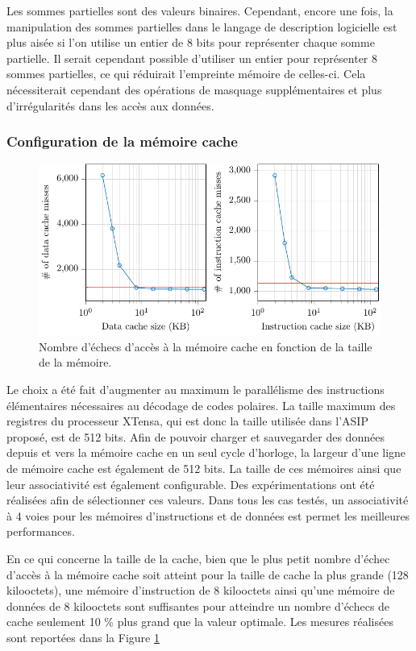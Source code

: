 Les sommes partielles sont des valeurs binaires. Cependant, encore une fois, la manipulation des sommes partielles dans le langage de description logicielle est plus aisée si l'on utilise un entier de 8 bits pour représenter chaque somme partielle. Il serait cependant possible d'utiliser un entier pour représenter 8 sommes partielles, ce qui réduirait l'empreinte mémoire de celles-ci. Cela nécessiterait cependant des opérations de masquage supplémentaires et plus d'irrégularités dans les accès aux données.

\subsubsection{Configuration de la mémoire cache}
\begin{figure}
\centering
\includegraphics[width=\textwidth]{main/ch3_fig/curves/memory/tikz/memory}
\caption{Nombre d'échecs d'accès à la mémoire cache en fonction de la taille de la mémoire.}
\label{fig:tensilica_mem}
\end{figure}

Le choix a été fait d'augmenter au maximum le parallélisme des instructions élémentaires nécessaires au décodage de codes polaires. La taille maximum des registres du processeur XTensa, qui est donc la taille utilisée dans l'ASIP proposé, est de 512 bits. Afin de pouvoir charger et sauvegarder des données depuis et vers la mémoire cache en un seul cycle d'horloge, la largeur d'une ligne de mémoire cache est également de 512 bits. La taille de ces mémoires ainsi que leur associativité est également configurable. Des expérimentations ont été réalisées afin de sélectionner ces valeurs. Dans tous les cas testés, un associativité à 4 voies pour les mémoires d'instructions et de données est permet les meilleures performances.

En ce qui concerne la taille de la cache, bien que le plus petit nombre d'échec d'accès à la mémoire cache soit atteint pour la taille de cache la plus grande (128 kilooctets), une mémoire d'instruction de 8 kilooctets ainsi qu'une mémoire de données de 8 kilooctets sont suffisantes pour atteindre un nombre d'échecs de cache seulement 10 \% plus grand que la valeur optimale. Les mesures réalisées sont reportées dans la Figure \ref{fig:tensilica_mem}

